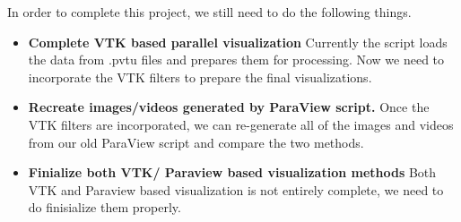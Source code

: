 In order to complete this project, we still need to do the following things.

\begin{itemize}
	\item \textbf{Complete VTK based parallel visualization} Currently the script loads the data from .pvtu files and prepares them for processing. Now we need to incorporate the VTK filters to prepare the final visualizations.
	\item \textbf{Recreate images/videos generated by ParaView script.} Once the VTK filters are incorporated, we can re-generate all of the images and videos from our old ParaView script and compare the two methods.
	\item \textbf{Finialize both VTK/ Paraview based visualization methods} Both VTK and Paraview based visualization is not entirely complete, we need to do finisialize them properly. 
\end{itemize}